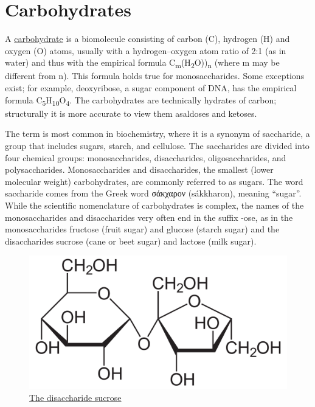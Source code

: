 \hypertarget{carbohydrates}{%
\section{Carbohydrates}\label{carbohydrates}}

A \href{https://en.wikipedia.org/wiki/Carbohydrate}{carbohydrate} is a biomolecule consisting of carbon (C), hydrogen (H) and oxygen (O) atoms, usually with a hydrogen--oxygen atom ratio of 2:1 (as in water) and thus with the empirical formula C\textsubscript{m}(H\textsubscript{2}O))\textsubscript{n} (where m may be different from n). This formula holds true for monosaccharides. Some exceptions exist; for example, deoxyribose, a sugar component of DNA, has the empirical formula C\textsubscript{5}H\textsubscript{10}O\textsubscript{4}. The carbohydrates are technically hydrates of carbon; structurally it is more accurate to view them asaldoses and ketoses.

The term is most common in biochemistry, where it is a synonym of saccharide, a group that includes sugars, starch, and cellulose. The saccharides are divided into four chemical groups: monosaccharides, disaccharides, oligosaccharides, and polysaccharides. Monosaccharides and disaccharides, the smallest (lower molecular weight) carbohydrates, are commonly referred to as sugars. The word saccharide comes from the Greek word σάκχαρον (sákkharon), meaning ``sugar''. While the scientific nomenclature of carbohydrates is complex, the names of the monosaccharides and disaccharides very often end in the suffix -ose, as in the monosaccharides fructose (fruit sugar) and glucose (starch sugar) and the disaccharides sucrose (cane or beet sugar) and lactose (milk sugar).



\begin{figure}

{\centering \includegraphics[width=0.7\linewidth]{./figures/chemistry/Saccharose2} 

}

\caption{\href{https://commons.wikimedia.org/wiki/File:Beta-D-Lactose.svg}{The disaccharide sucrose}}\label{fig:sucrosestruc}
\end{figure}

